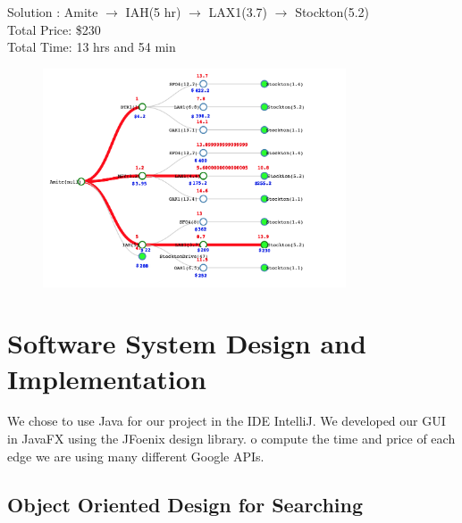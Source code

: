 \documentclass[11pt]{article}
\begin{document}
\pagebreak

\begin{center}
Solution : Amite $\rightarrow$ IAH(5 hr) $\rightarrow$ LAX1(3.7) $\rightarrow$ Stockton(5.2) \\
\quad Total Price: \$230 \\
\quad Total Time: 13 hrs and 54 min\\
\end{center}

\begin{figure}[!ht]
  \centering
  \includegraphics[width=0.8\textwidth]{time_lim}
  \label{fig:time_lim}
\end{figure}



\pagebreak

\section{Software System Design and Implementation}

We chose to use Java for our project in the IDE IntelliJ. We developed our GUI in JavaFX using the JFoenix design library.
o compute the time and price of each edge we are using many different Google APIs. 

\subsection{Object Oriented Design for Searching}
\end{document}
